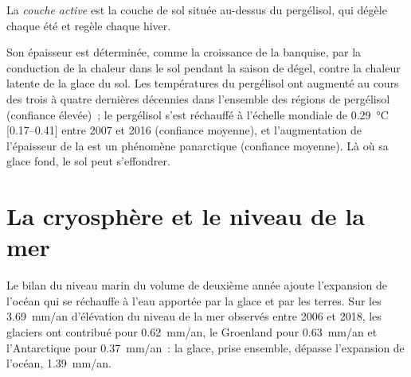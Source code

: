 \begin{definition}\label{def:b3:glaciology:permafrost}
La \emph{couche active} est la couche de sol située au-dessus du
pergélisol, qui dégèle chaque été et regèle chaque hiver.
\end{definition}

Son épaisseur est déterminée, comme la croissance de la banquise, par la conduction de
la chaleur dans le sol pendant la saison de dégel, contre la chaleur latente de la glace
du sol. Les températures du pergélisol ont augmenté au cours des trois à quatre dernières
décennies dans l'ensemble des régions de pergélisol (confiance élevée)~;
le pergélisol s'est réchauffé à l'échelle mondiale de \qty{0.29}{\celsius} [\numrange{0.17}{0.41}]
entre 2007 et 2016 (confiance moyenne), et l'augmentation de l'épaisseur de la 
est un phénomène panarctique (confiance moyenne). Là où sa glace fond, le sol peut
s'effondrer.

\section{La cryosphère et le niveau de la mer}\label{sec:b3:glaciology:sea-level}

Le bilan du niveau marin du volume de deuxième année ajoute l'expansion de l'océan qui se
réchauffe à l'eau apportée par la glace et par les terres. Sur les
\qty{3.69}{mm/an} d'élévation du niveau de la mer observés entre 2006 et 2018, les glaciers
ont contribué pour \qty{0.62}{mm/an}, le Groenland pour \qty{0.63}{mm/an} et l'Antarctique
pour \qty{0.37}{mm/an}~: la glace, prise ensemble, dépasse l'expansion de l'océan,
\qty{1.39}{mm/an}.

